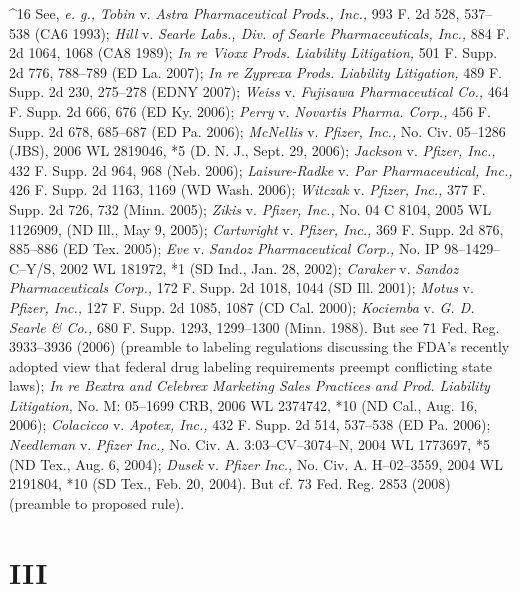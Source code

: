{{{^16 See, \emph{e. g., Tobin} v. \emph{Astra Pharmaceutical Prods., Inc.,}
993 F. 2d 528, 537--538 (CA6 1993); \emph{Hill} v. \emph{Searle Labs.,
Div. of Searle Pharmaceuticals, Inc.,} 884 F. 2d 1064, 1068 (CA8
1989); \emph{In re Vioxx Prods. Liability Litigation,} 501 F. Supp.
2d 776, 788--789 (ED La. 2007); \emph{In re Zyprexa Prods. Liability
Litigation,} 489 F. Supp. 2d 230, 275--278 (EDNY 2007); \emph{Weiss}
v. \emph{Fujisawa Pharmaceutical Co.,} 464 F. Supp. 2d 666, 676 (ED Ky.
2006); \emph{Perry} v. \emph{Novartis Pharma. Corp.,} 456 F. Supp. 2d 678,
685--687 (ED Pa. 2006); \emph{McNellis} v. \emph{Pfizer, Inc.,} No. Civ.
05--1286 (JBS), 2006 WL 2819046, *5 (D. N. J., Sept. 29, 2006);
\emph{Jackson} v. \emph{Pfizer, Inc.,} 432 F. Supp. 2d 964, 968 (Neb. 2006);
\emph{Laisure-Radke} v. \emph{Par Pharmaceutical, Inc.,} 426 F. Supp. 2d 1163,
1169 (WD Wash. 2006); \emph{Witczak} v. \emph{Pfizer, Inc.,} 377 F. Supp. 2d
726, 732 (Minn. 2005); \emph{Zikis} v. \emph{Pfizer, Inc.,} No. 04 C 8104,
2005 WL 1126909,  (ND Ill., May 9, 2005); \emph{Cartwright}
v. \emph{Pfizer, Inc.,} 369 F. Supp. 2d 876, 885--886 (ED Tex. 2005);
\emph{Eve} v. \emph{Sandoz Pharmaceutical Corp.,} No. IP 98--1429--C--Y/S,
2002 WL 181972, *1 (SD Ind., Jan. 28, 2002); \emph{Caraker} v. \emph{Sandoz
Pharmaceuticals Corp.,} 172 F. Supp. 2d 1018, 1044 (SD Ill. 2001);
\emph{Motus} v. \emph{Pfizer, Inc.,} 127 F. Supp. 2d 1085, 1087 (CD Cal.
2000); \emph{Kociemba} v. \emph{G. D. Searle \& Co.,} 680 F. Supp. 1293,
1299--1300 (Minn. 1988). But see 71 Fed. Reg. 3933--3936 (2006)
(preamble to labeling regulations discussing the FDA's recently
adopted view that federal drug labeling requirements preempt conflicting
state laws); \emph{In re Bextra and Celebrex Marketing Sales Practices and
Prod. Liability Litigation,} No. M: 05--1699 CRB, 2006 WL 2374742,
*10 (ND Cal., Aug. 16, 2006); \emph{Colacicco} v. \emph{Apotex, Inc.,} 432 F.
Supp. 2d 514, 537--538 (ED Pa. 2006); \emph{Needleman} v. \emph{Pfizer Inc.,}
No. Civ. A. 3:03--CV--3074--N, 2004 WL 1773697, *5 (ND Tex., Aug. 6,
2004); \emph{Dusek} v. \emph{Pfizer Inc.,} No. Civ. A. H--02--3559, 2004 WL
2191804, *10 (SD Tex., Feb. 20, 2004). But cf. 73 Fed. Reg. 2853 (2008)
(preamble to proposed rule).

\section{III}

}}}
